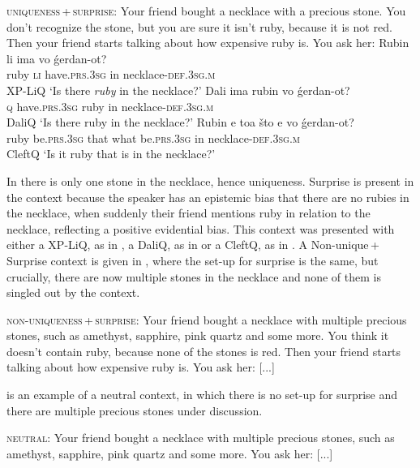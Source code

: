 \documentclass[output=paper]{langscibook}
\begin{document}
\eanoraggedright
\eanoraggedright \textsc{uniqueness\,+\,surprise}: Your friend bought a necklace with a precious stone. You don’t recognize the stone, but you are sure it isn't ruby, because it is not red. Then your friend starts talking about how expensive ruby is. You ask her: \label{unisur}
    \ex \gll Rubin li ima vo ǵerdan-ot? \\
ruby \textsc{li} have.\textsc{prs.3sg} in necklace-\textsc{def.3sg.m} \\ \hfill XP-LiQ
\glt `Is there \emph{ruby} in the necklace?'  \label{rubinli}
    \ex \gll Dali ima rubin vo ǵerdan-ot? \\
\textsc{q} have.\textsc{prs.3sg} ruby in necklace-\textsc{def.3sg.m} \\ \hfill DaliQ
\glt `Is there ruby in the necklace?'  \label{dalirubin}
    \ex \gll Rubin e toa što e vo ǵerdan-ot? \\
ruby be.\textsc{prs.3sg} that what be.\textsc{prs.3sg} in necklace-\textsc{def.3sg.m} \\ \hfill CleftQ
\glt `Is it ruby that is in the necklace?'  \label{cleftrubin}
\z\z

\noindent In  there is only one stone in the necklace, hence uniqueness. Surprise is present in the context because the speaker has an epistemic bias that there are no rubies in the necklace, when suddenly their friend mentions ruby in relation to the necklace, reflecting a positive evidential bias.
This context was presented with either a XP-LiQ, as in , a DaliQ, as in  or a CleftQ, as in . A Non-unique\,+\,Surprise context is given in , where the set-up for surprise is the same, but crucially, there are now multiple stones in the necklace and none of them is singled out by the context.


\eanoraggedright \textsc{non-uniqueness\,+\,surprise:} Your friend bought a necklace with multiple precious stones, such as amethyst, sapphire, pink quartz and some more. You think it doesn't contain ruby, because none of the stones is red. Then your friend starts talking about how expensive ruby is. You ask her: [...] \label{nonunisur}
\z

\noindent
{} is an example of a neutral context, in which there is no set-up for surprise and there are multiple precious stones under discussion.


\eanoraggedright
\textsc{neutral:} Your friend bought a necklace with multiple precious stones, such as amethyst, sapphire, pink quartz and some more. You ask her: [...] \label{neut}
\z
\end{document}
